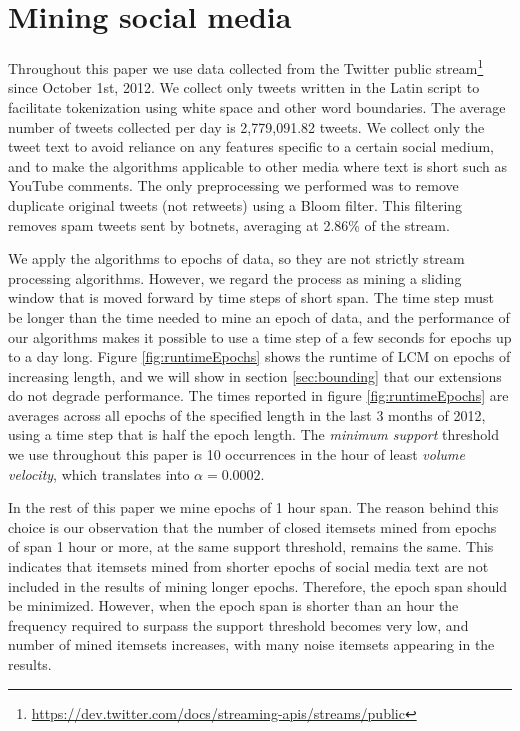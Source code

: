 \documentclass{sig-alternate}
\begin{document}
\section{Mining social media}
\label{sec:socmine}

Throughout this paper we use data collected from the Twitter public
stream\footnote{\scriptsize \url{https://dev.twitter.com/docs/streaming-apis/streams/public}}
since October 1st, 2012. 
We collect only tweets written in the Latin script to facilitate tokenization
using white space and other word boundaries.
The average number of tweets collected per day is 2,779,091.82 tweets.
We collect only the tweet text to avoid reliance on any features specific to a
certain social medium,
and to make the algorithms applicable to other media where text is short  
such as YouTube comments.
The only preprocessing we performed was to remove duplicate original tweets
(not retweets) using a Bloom filter.
This filtering removes spam tweets sent by botnets, averaging at 2.86\% of the stream. 

We apply the algorithms to epochs of data, so they are not strictly stream
processing algorithms.
However, we regard the process as mining a sliding window that is moved
forward by time steps of short span.
The time step must be longer than the time needed to mine an epoch of data,
and the performance of our algorithms makes it possible to use a time step
of a few seconds for epochs up to a day long.
Figure \ref{fig:runtimeEpochs} shows the runtime of LCM on epochs of
increasing length, and we will show in section \ref{sec:bounding} that our
extensions do not degrade performance.
The times reported in figure \ref{fig:runtimeEpochs} are averages across all
epochs of the specified length in the last 3 months of 2012, %
using a time step that is half the epoch length.
The \emph{minimum support} threshold we use throughout this paper
is 10 occurrences in the hour of least \emph{volume velocity},
which translates into $\alpha = 0.0002$.

In the rest of this paper we mine epochs of 1 hour span.
The reason behind this choice is our observation that the number of closed
itemsets mined from epochs of span 1 hour or more,
at the same support threshold, remains the same.
This indicates that itemsets mined from shorter epochs of social media text
are not included in the results of mining longer epochs. 
Therefore, the epoch span should be minimized.
However, when the epoch span is shorter than an hour the frequency required
to surpass the support threshold becomes very low,
and number of mined itemsets increases, with many noise itemsets appearing in
the results.
\end{document}
